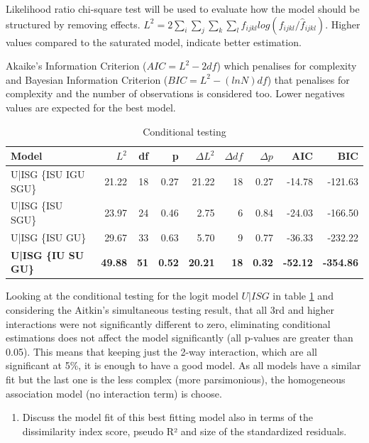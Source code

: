 \documentclass[
  12pt,
]{article}
\providecommand{\tightlist}{%
  \setlength{\itemsep}{0pt}\setlength{\parskip}{0pt}}
\begin{document}
Likelihood ratio chi-square test will be used to evaluate how the model should be structured by removing effects. \(L^2=2\sum_i\sum_j\sum_k\sum_l f_{ijkl}log(f_{ijkl}/\hat f_{ijkl})\). Higher values compared to the saturated model, indicate better estimation.  

Akaike's Information Criterion (\(AIC=L^2-2df\)) which penalises for complexity and Bayesian Information Criterion (\(BIC=L^2-(lnN)df\)) that penalises for complexity and the number of observations is considered too. Lower negatives values are expected for the best model.  

\begin{table}[H]

\caption{\label{tab:condit}Conditional testing}
\centering
\begin{tabular}[t]{l|r|r|r|r|r|r|r|r}
\hline
Model & $L^2$ & df & p & $\Delta L^2$ & $\Delta df$ & $\Delta p$ & AIC & BIC\\
\hline
U|ISG \{ISU IGU SGU\} & 21.22 & 18 & 0.27 & 21.22 & 18 & 0.27 & -14.78 & -121.63\\
\hline
U|ISG \{ISU SGU\} & 23.97 & 24 & 0.46 & 2.75 & 6 & 0.84 & -24.03 & -166.50\\
\hline
U|ISG \{ISU GU\} & 29.67 & 33 & 0.63 & 5.70 & 9 & 0.77 & -36.33 & -232.22\\
\hline
\textbf{U|ISG \{IU SU GU\}} & \textbf{49.88} & \textbf{51} & \textbf{0.52} & \textbf{20.21} & \textbf{18} & \textbf{0.32} & \textbf{-52.12} & \textbf{-354.86}\\
\hline
\end{tabular}
\end{table}

Looking at the conditional testing for the logit model \(U|ISG\) in table \ref{tab:condit} and considering the Aitkin's simultaneous testing result, that all 3rd and higher interactions were not significantly different to zero, eliminating conditional estimations does not affect the model significantly (all p-values are greater than 0.05). This means that keeping just the 2-way interaction, which are all significant at 5\%, it is enough to have a good model. As all models have a similar fit but the last one is the less complex (more parsimonious), the homogeneous association model (no interaction term) is choose.

\begin{enumerate}
\def\labelenumi{\arabic{enumi}.}
\setcounter{enumi}{4}
\tightlist
\item
  Discuss the model fit of this best fitting model also in terms of the dissimilarity index score, pseudo R² and size of the standardized residuals.
\end{enumerate}
\end{document}
